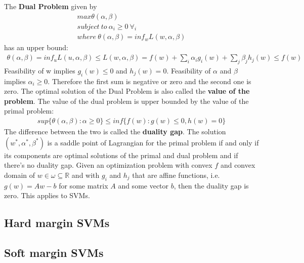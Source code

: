 \documentclass[main]{subfiles}
\begin{document}
The \textbf{Dual Problem} given by
\begin{align}
max \theta(\alpha, \beta) \\
subject \ to \ \alpha_i \geq 0 \ \forall_i \\
where \ \theta(\alpha, \beta)=inf_w L(w, \alpha, \beta)
\end{align}
has an upper bound:
\begin{align}
\theta(\alpha, \beta)=inf_u L(u, \alpha, \beta) \leq L(w, \alpha, \beta)=f(w)+\sum_i \alpha_i g_i(w) + \sum_j \beta_j h_j(w) \leq f(w)
\end{align}
Feasibility of w implies $g_i(w)\leq 0$ and $h_j(w)=0$. \newline
Feasibility of $\alpha$ and $\beta$ implies $\alpha_i \geq 0$. \newline
Therefore the first sum is negative or zero and the second one is zero.\newline
The optimal solution of the Dual Problem is also called the \textbf{value of the problem}.
The value of the dual problem is upper bounded by the value of the primal problem:
\begin{align}
sup\{\theta(\alpha,\beta): \alpha \geq 0 \} \leq inf \{f(w): g(w) \leq 0, h(w) = 0\}
\end{align}
The difference between the two is called the \textbf{duality gap}. The solution $(w^*, \alpha^*, \beta^*)$ is a saddle point of Lagrangian for the primal problem if and only if its components are optimal solutions of the primal and dual problem and if there's no duality gap. \newline
Given an optimization problem with convex $f$ and convex domain of $w \in \omega \subseteq \mathbb{R}$ and with $g_i$ and $h_j$ that are affine functions, i.e. $g(w)=Aw-b$ for some matrix $A$ and some vector $b$, then the duality gap is zero. This applies to SVMs.
\subsection{Hard margin SVMs}
\subsection{Soft margin SVMs}
\end{document}
